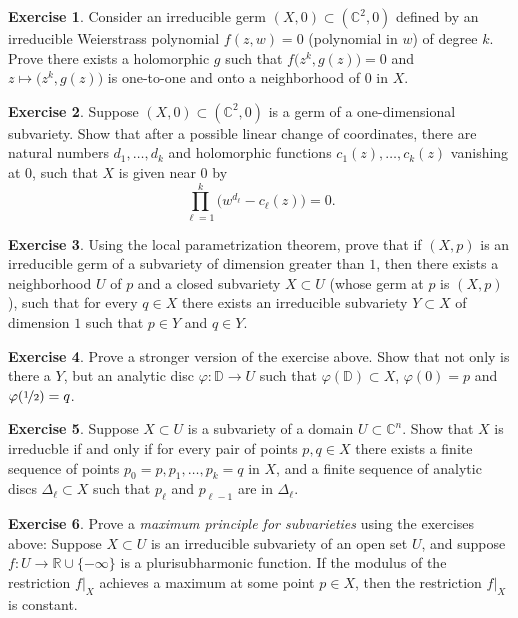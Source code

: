 \documentclass[12pt,openany]{book}
\newcommand{\C}{{\mathbb{C}}}
\newcommand{\R}{{\mathbb{R}}}
\newcommand{\D}{{\mathbb{D}}}
\theoremstyle{plain}
\theoremstyle{remark}
\theoremstyle{definition}
\newenvironment{exbox}{%
    \def\FrameCommand{\vrule width 1pt \relax\hspace{10pt}}%
    \MakeFramed{\advance\hsize-\width\FrameRestore}%
}{%
    \endMakeFramed
}
\theoremstyle{exercise}
\newtheorem{exercise}{Exercise}[section]
\theoremstyle{example}
\begin{document}
\begin{exbox}
\begin{exercise}
\pagebreak[2]
Consider an irreducible germ
$(X,0) \subset (\C^2,0)$ defined
by an irreducible Weierstrass polynomial $f(z,w) = 0$ (polynomial in $w$)
of degree $k$.  Prove there exists a holomorphic $g$ such that
$f\bigl(z^k,g(z)\bigr) = 0$ and $z \mapsto \bigl(z^k,g(z)\bigr)$
is one-to-one and onto a neighborhood of $0$ in $X$.
\end{exercise}

\begin{exercise}
Suppose $(X,0) \subset (\C^2,0)$ is a germ of a one-dimensional subvariety.
Show that after a possible linear change of coordinates,
there are natural numbers
$d_1,\ldots,d_k$
and
holomorphic functions $c_1(z),\ldots,c_k(z)$ vanishing at $0$,
such that $X$ is given near $0$ by
\begin{equation*}
\prod_{\ell=1}^k {\bigl( w^{d_\ell} - c_\ell(z) \bigr)} = 0.
\end{equation*}
\end{exercise}

\begin{exercise}
\pagebreak[2]
Using the local parametrization theorem, prove that
if $(X,p)$ is an irreducible germ of a subvariety of dimension greater
than $1$, then there exists a neighborhood $U$ of $p$ and a closed subvariety
$X \subset U$ (whose germ at $p$ is $(X,p)$), such that for every
$q \in X$ there exists an irreducible subvariety $Y \subset X$
of dimension $1$ such that $p \in Y$ and $q \in Y$.
\end{exercise}

\begin{exercise}
\pagebreak[2]
Prove a stronger version of the exercise above.  Show that not only is there
a $Y$, but an analytic disc $\varphi \colon \D \to U$ such that
$\varphi(\D) \subset X$, $\varphi(0) = p$ and $\varphi(\nicefrac{1}{2}) =
q$.
\end{exercise}

\begin{exercise}
Suppose $X \subset U$ is a subvariety of a domain $U \subset \C^n$.
Show that $X$ is irreducble
if and only if
for every pair of points $p,q \in X$ there exists a finite sequence
of points $p_0 = p, p_1, \ldots, p_k = q$ in $X$, and a finite sequence of analytic discs
$\Delta_\ell \subset X$ such that $p_{\ell}$ and $p_{\ell-1}$ are in
$\Delta_\ell$.
\end{exercise}

\begin{exercise}\label{exercise:maxprincsubvar}
Prove a \emph{maximum principle for subvarieties} using the exercises above:
Suppose $X \subset U$ is an irreducible subvariety of an open set $U$,
and suppose $f \colon U \to \R \cup \{ - \infty \}$
is a plurisubharmonic function.  If the modulus of the restriction $f|_X$
achieves a maximum
at some point $p \in X$, then the restriction $f|_X$ is constant.
\end{exercise}


\end{exbox}
\end{document}
